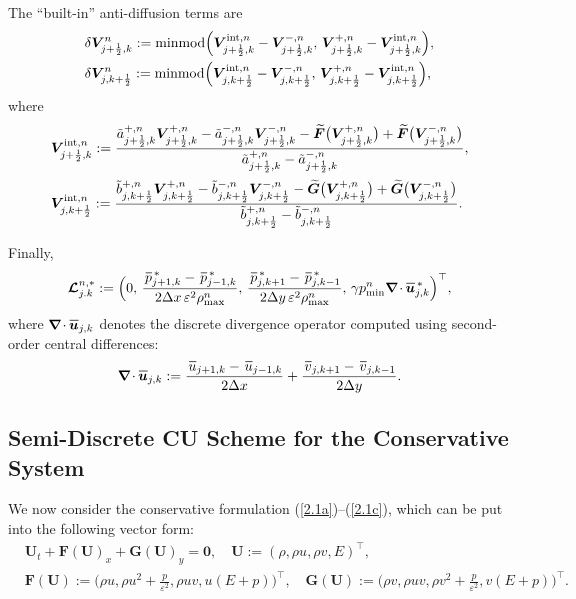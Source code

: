 \documentclass[A4paper,12pt,twoside]{article}
\numberwithin{equation}{section}
\numberwithin{figure}{section}
\numberwithin{table}{section}
\def\bnabla{\bm{\nabla}}
\newcommand{\dx}{\Delta x}
\newcommand{\dy}{\Delta y}
\newcommand{\kph}{{k+\frac{1}{2}}}
\newcommand{\jph}{{j+\frac{1}{2}}}
\newcommand{\mF}{\bm{F}}
\newcommand{\mG}{\bm{G}}
\newcommand{\ve}{\varepsilon}
\newcommand\eref[1]{(\ref{#1})}
\newcommand*\xbar[1]{%
  \hbox{%
    \vbox{%
      \hrule height 0.5pt %
      \kern0.4ex%
      \hbox{%
        \kern-0.05em%
        \ensuremath{#1}%
        \kern-0.00em%
      }%
    }%
  }%
}
\begin{document}
The ``built-in'' anti-diffusion terms are
$$
\begin{aligned}
&\delta\bm V_{\jph,k}^n:={\rm minmod}\Big(\bm V_{\jph,k}^{{\rm int},n}-\bm V^{-,n}_{\jph,k},\,
\bm V^{+,n}_{\jph,k}-\bm V_{\jph,k}^{{\rm int},n}\Big),\\
&\delta\bm V_{j,\kph}^n:={\rm minmod}\Big(\bm V_{j,\kph}^{{\rm int},n}-\bm V^{-,n}_{j,\kph},\,
\bm V^{+,n}_{j,\kph}-\bm V_{j,\kph}^{{\rm int},n}\Big),
\end{aligned}
$$
where 
$$
\begin{aligned}
&\bm V_{\jph,k}^{{\rm int},n}:=\frac{\tilde a^{+,n}_{\jph,k}\bm V^{+,n}_{\jph,k}-\tilde a^{-,n}_{\jph,k}\bm V^{-,n}_{\jph,k}
-\widetilde{\bm F}\big(\bm V^{+,n}_{\jph,k}\big)+\widetilde{\bm F}\big(\bm V^{-,n}_{\jph,k}\big)}
{\tilde a^{+,n}_{\jph,k}-\tilde a^{-,n}_{\jph,k}},\\[0.3ex]
&\bm V_{j,\kph}^{{\rm int},n}:=\frac{\tilde b^{+,n}_{j,\kph}\bm V^{+,n}_{j,\kph}-\tilde b^{-,n}_{j,\kph}\bm V^{-,n}_{j,\kph}
-\widetilde{\bm G}\big(\bm V^{+,n}_{j,\kph}\big)+\widetilde{\bm G}\big(\bm V^{-,n}_{j,\kph}\big)}
{\tilde b^{+,n}_{j,\kph}-\tilde b^{-,n}_{j,\kph}}.
\end{aligned}
$$

Finally,
\begin{equation}
\bm{{\cal L}}^{n,*}_{j.k}:=\Big(0,\,\frac{\,\xbar p_{j+1,k}^{\,*}-\,\xbar p_{j-1,k}^{\,*}}{2\dx\,\ve^2\rho_{\max}^n},\,
\frac{\,\xbar p_{j,k+1}^{\,*}-\,\xbar p_{j,k-1}^{\,*}}{2\dy\,\ve^2\rho_{\max}^n},\,
\gamma p_{\min}^n\bnabla\!\cdot\xbar{\bm u}_{j,k}^{\,*}\Big)^\top,
\label{4.48b}
\end{equation}
where $\bnabla\!\cdot\xbar{\bm u}_{j,k}$ denotes the discrete divergence operator computed using second-order central differences:
\begin{equation}
\bnabla\!\cdot\xbar{\bm u}_{j,k}:=\frac{\,\xbar u_{j+1,k}-\,\xbar u_{j-1,k}}{2\dx}+\frac{\,\xbar v_{j,k+1}-\,\xbar v_{j,k-1}}{2\dy}.
\label{3.38f}
\end{equation}

\subsection{Semi-Discrete CU Scheme for the Conservative System}\label{sec42}
We now consider the conservative formulation \eref{2.1a}--\eref{2.1c}, which can be put into the following vector form:
\begin{equation}
\begin{aligned}
&\bm U_t+\mF(\bm U)_x+\mG(\bm U)_y=\bm0,\quad\bm U:=(\rho,\rho u,\rho v,E)^\top,\\
&\mF(\bm U):=\Big(\rho u,\rho u^2+\frac{p}{\ve^2},\rho uv,u(E+p)\Big)^\top,\quad
\mG(\bm U):=\Big(\rho v,\rho uv,\rho v^2+\frac{p}{\ve^2},v(E+p)\Big)^\top.
\end{aligned}
\label{3.39g}
\end{equation}
\end{document}
